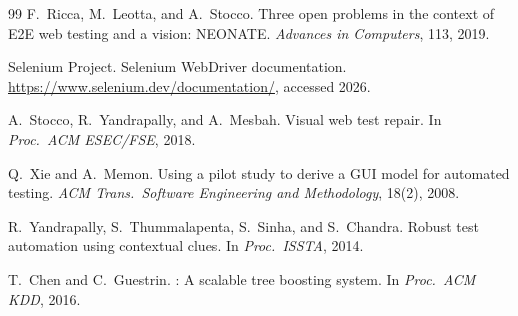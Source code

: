 \documentclass[12pt]{article}
\begin{document}
\begin{thebibliography}{99}
F.~Ricca, M.~Leotta, and A.~Stocco.
\newblock Three open problems in the context of {E2E} web testing and a vision: {NEONATE}.
\newblock \emph{Advances in Computers}, 113, 2019.

{Selenium Project}.
\newblock Selenium {WebDriver} documentation.
\newblock \url{https://www.selenium.dev/documentation/}, accessed 2026.

A.~Stocco, R.~Yandrapally, and A.~Mesbah.
\newblock Visual web test repair.
\newblock In \emph{Proc.\ ACM ESEC/FSE}, 2018.

Q.~Xie and A.~Memon.
\newblock Using a pilot study to derive a {GUI} model for automated testing.
\newblock \emph{ACM Trans.\ Software Engineering and Methodology}, 18(2), 2008.

R.~Yandrapally, S.~Thummalapenta, S.~Sinha, and S.~Chandra.
\newblock Robust test automation using contextual clues.
\newblock In \emph{Proc.\ ISSTA}, 2014.

T.~Chen and C.~Guestrin.
: A scalable tree boosting system.
\newblock In \emph{Proc.\ ACM KDD}, 2016.

\end{thebibliography}
\end{document}
